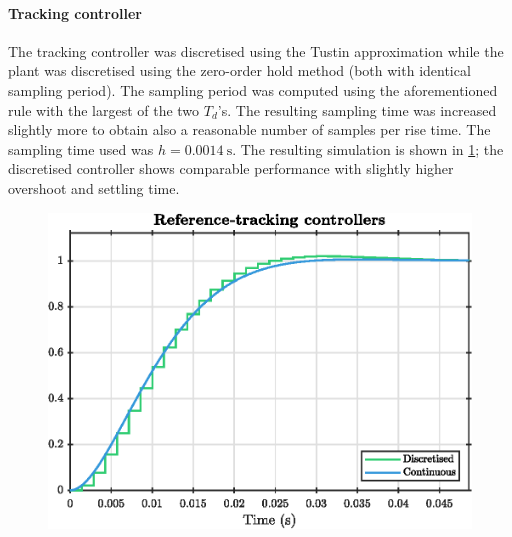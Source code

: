 \paragraph{Tracking controller}
The tracking controller was discretised using the Tustin approximation while the plant was discretised using the zero-order hold method (both with identical sampling period). The sampling period was computed using the aforementioned rule with the largest of the two $T_d$'s. The resulting sampling time was increased slightly more to obtain also a reasonable number of samples per rise time. The sampling time used was $h = \SI{0.0014}{\second}$. The resulting simulation is shown in \cref{fig:q4_dt_tracking}; the discretised controller shows comparable performance with slightly higher overshoot and settling time.
\begin{figure}[ht]
    \centering
    \includegraphics[]{media/q4/dt_tracking.eps}
    \caption{}
    \label{fig:q4_dt_tracking}
\end{figure}

